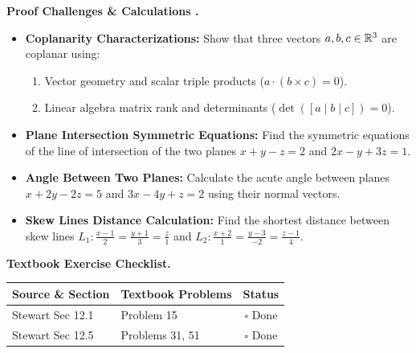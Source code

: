 \documentclass{natsirt}
\newcounter{topic}[section]
\newenvironment{challengebox}[1][]{%
    \begin{redbox}[#1]\refstepcounter{topic}\textbf{Proof Challenges \& Calculations \thesection.\thetopic}%
}{\end{redbox}}
\newenvironment{reviewbox}[1][]{\begin{whitebox}[#1]\textbf{Textbook Exercise Checklist. }}{\end{whitebox}}
\newcommand{\citem}{\item[$\square$]}
\begin{document}
\begin{challengebox}
    \begin{itemize}
        \citem \textbf{Coplanarity Characterizations:} Show that three vectors $a, b, c \in \mathbb{R}^3$ are coplanar using:
        \begin{enumerate}
            \item Vector geometry and scalar triple products ($a \cdot (b \times c) = 0$).
            \item Linear algebra matrix rank and determinants ($\det([a \mid b \mid c]) = 0$).
        \end{enumerate}
        \citem \textbf{Plane Intersection Symmetric Equations:} Find the symmetric equations of the line of intersection of the two planes $x + y - z = 2$ and $2x - y + 3z = 1$.
        \citem \textbf{Angle Between Two Planes:} Calculate the acute angle between planes $x + 2y - 2z = 5$ and $3x - 4y + z = 2$ using their normal vectors.
        \citem \textbf{Skew Lines Distance Calculation:} Find the shortest distance between skew lines $L_1: \frac{x-1}{2} = \frac{y+1}{3} = \frac{z}{1}$ and $L_2: \frac{x+2}{1} = \frac{y-3}{-2} = \frac{z-1}{4}$.
    \end{itemize}
\end{challengebox}

\begin{reviewbox}
    \begin{center}
    \begin{tabular}{|l|l|c|}
        \hline
        \textbf{Source \& Section} & \textbf{Textbook Problems} & \textbf{Status} \\
        \hline
        Stewart Sec 12.1 & Problem 15 & $\square$ Done \\
        Stewart Sec 12.5 & Problems 31, 51 & $\square$ Done \\
        \hline
    \end{tabular}
    \end{center}
\end{reviewbox}
\end{document}
